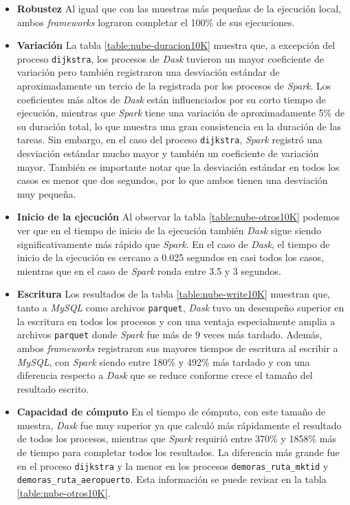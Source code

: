 \begin{itemize}
	
	\item \textbf{Robustez} Al igual que con las muestras más pequeñas de la ejecución local, ambos \textit{frameworks} lograron completar el 100\% de sus ejecuciones.
	
	\item \textbf{Variación} La tabla \ref{table:nube-duracion10K} muestra que, a excepción del proceso \texttt{dijkstra}, los procesos de \textit{Dask} tuvieron un mayor coeficiente de variación pero también registraron una desviación estándar de aproximadamente un tercio de la registrada por los procesos de \textit{Spark}. Los coeficientes más altos de \textit{Dask} están influenciados por su corto tiempo de ejecución, mientras que \textit{Spark} tiene una variación de aproximadamente 5\% de su duración total, lo que muestra una gran consistencia en la duración de las tareas. Sin embargo, en el caso del proceso \texttt{dijkstra}, \textit{Spark} registró una desviación estándar mucho mayor y también un coeficiente de variación mayor.  También es importante notar que la desviación estándar en todos los casos es menor que dos segundos, por lo que ambos tienen una desviación muy pequeña. 
	
	\item \textbf{Inicio de la ejecución} Al observar la tabla \ref{table:nube-otros10K} podemos ver que en el tiempo de inicio de la ejecución también \textit{Dask} sigue siendo significativamente más rápido que \textit{Spark}. En el caso de \textit{Dask}, el tiempo de inicio de la ejecución es cercano a 0.025 segundos en casi todos los casos, mientras que en el caso de \textit{Spark} ronda entre 3.5 y 3 segundos.
	
	\item \textbf{Escritura} Los resultados de la tabla \ref{table:nube-write10K} muestran que, tanto a \textit{MySQL} como archivos \texttt{parquet}, \textit{Dask} tuvo un desempeño superior en la escritura en todos los procesos y con una ventaja especialmente amplia a archivos \texttt{parquet} donde \textit{Spark} fue más de 9 veces más tardado. Además, ambos \textit{frameworks} registraron sus mayores tiempos de escritura al escribir a \textit{MySQL}, con \textit{Spark} siendo entre 180\% y 492\% más tardado y con una diferencia respecto a \textit{Dask} que se reduce conforme crece el tamaño del resultado escrito. 
	
	\item \textbf{Capacidad de cómputo} En el tiempo de cómputo, con este tamaño de muestra, \textit{Dask} fue muy superior ya que calculó más rápidamente el resultado de todos los procesos, mientras que \textit{Spark} requirió entre 370\% y 1858\% más de tiempo para completar todos los resultados. La diferencia más grande fue en el proceso \texttt{dijkstra} y la menor en los procesos \texttt{demoras\_ruta\_mktid} y \texttt{demoras\_ruta\_aeropuerto}. Esta información se puede revisar en la tabla \ref{table:nube-otros10K}.


\end{itemize}
